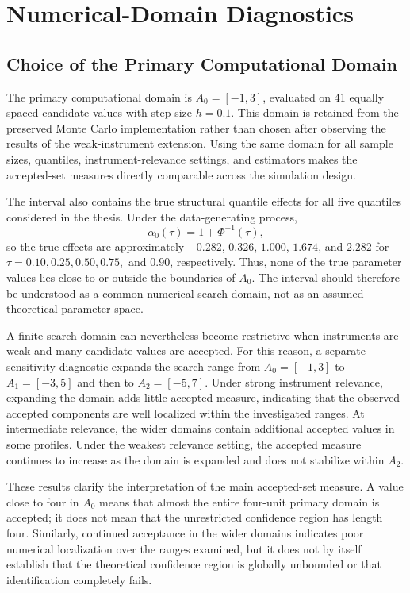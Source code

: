 \section{Numerical-Domain Diagnostics}
\label{app:numerical-domain-diagnostics}

\subsection{Choice of the Primary Computational Domain}
\label{app:domain-choice}

The primary computational domain is \(A_0=[-1,3]\), evaluated on 41 equally spaced candidate values with step size \(h=0.1\). This domain is retained from the preserved Monte Carlo implementation rather than chosen after observing the results of the weak-instrument extension. Using the same domain for all sample sizes, quantiles, instrument-relevance settings, and estimators makes the accepted-set measures directly comparable across the simulation design.

The interval also contains the true structural quantile effects for all five quantiles considered in the thesis. Under the data-generating process,
\[
\alpha_0(\tau)=1+\Phi^{-1}(\tau),
\]
so the true effects are approximately \(-0.282\), \(0.326\), \(1.000\), \(1.674\), and \(2.282\) for \(\tau=0.10,0.25,0.50,0.75,\) and \(0.90\), respectively. Thus, none of the true parameter values lies close to or outside the boundaries of \(A_0\). The interval should therefore be understood as a common numerical search domain, not as an assumed theoretical parameter space.

A finite search domain can nevertheless become restrictive when instruments are weak and many candidate values are accepted. For this reason, a separate sensitivity diagnostic expands the search range from \(A_0=[-1,3]\) to \(A_1=[-3,5]\) and then to \(A_2=[-5,7]\). Under strong instrument relevance, expanding the domain adds little accepted measure, indicating that the observed accepted components are well localized within the investigated ranges. At intermediate relevance, the wider domains contain additional accepted values in some profiles. Under the weakest relevance setting, the accepted measure continues to increase as the domain is expanded and does not stabilize within \(A_2\).

These results clarify the interpretation of the main accepted-set measure. A value close to four in \(A_0\) means that almost the entire four-unit primary domain is accepted; it does not mean that the unrestricted confidence region has length four. Similarly, continued acceptance in the wider domains indicates poor numerical localization over the ranges examined, but it does not by itself establish that the theoretical confidence region is globally unbounded or that identification completely fails.

